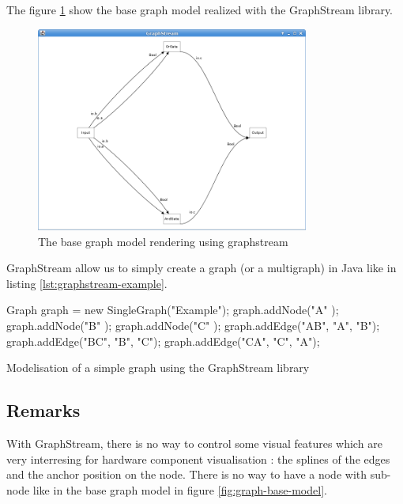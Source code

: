 The figure \ref{fig:base-graph-model-graphstream} show the base graph model
realized with the GraphStream library.

\begin{figure}[H]
  \centering
  \includegraphics[width=0.8\textwidth]{img/graphstream-base-model-example}
  \caption{The base graph model rendering using graphstream}
  \label{fig:base-graph-model-graphstream}
\end{figure}

GraphStream allow us to simply create a graph (or a multigraph) in Java like in
listing \ref{lst:graphstream-example}.

\begin{listing}[H]
  \centering
  \begin{javacode}
  Graph graph = new SingleGraph("Example");
  graph.addNode("A" );
  graph.addNode("B" );
  graph.addNode("C" );
  graph.addEdge("AB", "A", "B");
  graph.addEdge("BC", "B", "C");
  graph.addEdge("CA", "C", "A");
  \end{javacode}
  \caption[A simple graph modelisation using GraphStream]{Modelisation of a
    simple graph using the GraphStream library}
  \label{lst:graphstream-example}
\end{listing}

\subsection{Remarks}
\label{sub:Remarks}

With GraphStream, there is no way to control some visual features which are very
interresing for hardware component visualisation : the splines of the edges and
the anchor position on the node. There is no way to have a node with sub-node
like in the base graph model in figure \ref{fig:graph-base-model}.

